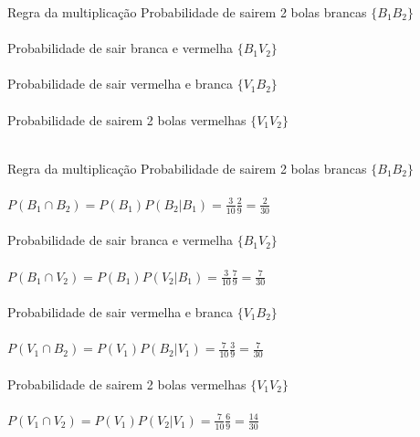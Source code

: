 \documentclass[10pt]{beamer}\usepackage[]{graphicx}\usepackage[]{color}
\theoremstyle{definition}
\begin{document}
\begin{frame}[fragile]{Regra da multiplicação} %
  Probabilidade de sairem 2 bolas brancas $\{B_1B_2\}$ \\~\\
  \vspace{1em}
  Probabilidade de sair branca e vermelha $\{B_1V_2\}$ \\~\\
    \vspace{1em}
  Probabilidade de sair vermelha e branca $\{V_1B_2\}$ \\~\\
    \vspace{1em}
    Probabilidade de sairem 2 bolas vermelhas $\{V_1V_2\}$ \\~\\
\end{frame}

\begin{frame}[fragile]{Regra da multiplicação} %
  Probabilidade de sairem 2 bolas brancas $\{B_1B_2\}$ \\~\\
  $P(B_1 \cap B_2) = P(B_1)P(B_2|B_1)  = \frac{3}{10} \frac{2}{9}
  = \frac{2}{30}$ \\~\\
  Probabilidade de sair branca e vermelha $\{B_1V_2\}$ \\~\\
  $P(B_1 \cap V_2) = P(B_1)P(V_2|B_1)  = \frac{3}{10} \frac{7}{9}
  = \frac{7}{30}$ \\~\\
  Probabilidade de sair vermelha e branca $\{V_1B_2\}$ \\~\\
  $P(V_1 \cap B_2) = P(V_1)P(B_2|V_1)  = \frac{7}{10} \frac{3}{9}
  = \frac{7}{30}$ \\~\\
    Probabilidade de sairem 2 bolas vermelhas $\{V_1V_2\}$ \\~\\
  $P(V_1 \cap V_2) = P(V_1)P(V_2|V_1)  = \frac{7}{10} \frac{6}{9}
  = \frac{14}{30}$
\end{frame}
\end{document}
